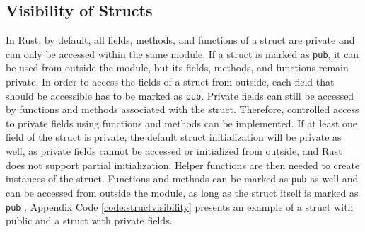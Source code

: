 \subsection{Visibility of Structs}
In Rust, by default, all fields, methods, and functions of a struct are private and can only be accessed within the same module.
If a struct is marked as \texttt{pub}, it can be used from outside the module, but its fields, methods, and functions remain private.
In order to access the fields of a struct from outside, each field that should be accessible has to be marked as \texttt{pub}.
Private fields can still be accessed by functions and methods associated with the struct. Therefore, controlled access to private fields using functions and methods can be implemented.
If at least one field of the struct is private, the default struct initialization will be private as well, as private fields cannot be accessed or initialized from outside, and Rust does not support partial initialization.
Helper functions are then needed to create instances of the struct.
Functions and methods can be marked as \texttt{pub} as well and can be accessed from outside the module, as long as the struct itself is marked as \texttt{pub} \cite[210-211]{Blandy_Jim2021-07-20} \cite[Chapter~7.3]{rustbook} \cite[Chapter~12.6]{rustref}.
Appendix Code \ref{code:structvisibility} presents an example of a struct with public and a struct with private fields.


